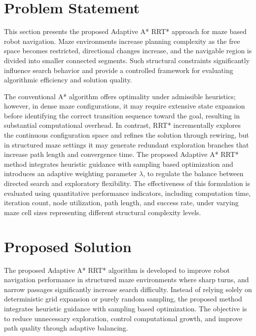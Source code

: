 \documentclass[a4paper,12pt,one side]{report}
\theoremstyle{definition}
\begin{document}
\begin{itemize}
\section{Problem Statement}

This section presents the proposed Adaptive A* RRT* approach for maze based robot navigation.\cite{ju2020path} Maze environments increase planning complexity as the free space becomes restricted, directional changes increase, and the navigable region is divided into smaller connected segments. Such structural constraints significantly influence search behavior and provide a controlled framework for evaluating algorithmic efficiency and solution quality.\cite{karur2021survey}

The conventional A* algorithm offers optimality under admissible heuristics; however, in dense maze configurations, \cite{souissi2013path} it may require extensive state expansion before identifying the correct transition sequence toward the goal, resulting in substantial computational overhead. In contrast, RRT* incrementally explores the continuous configuration space and refines the solution through rewiring, but in structured maze settings it may generate redundant exploration branches that increase path length and convergence time. The proposed Adaptive A* RRT* method integrates heuristic guidance with sampling based optimization and introduces an adaptive weighting parameter $\lambda$, to regulate the balance between directed search and exploratory flexibility. The effectiveness of this formulation is evaluated using quantitative performance indicators, including computation time, iteration count, node utilization, path length, and success rate, under varying maze cell sizes representing different structural complexity levels.

\section{Proposed Solution}

The proposed Adaptive A* RRT* algorithm is developed to improve robot navigation performance in structured maze environments where sharp turns, and narrow passages significantly increase search difficulty. Instead of relying solely on deterministic grid expansion or purely random sampling, the proposed method integrates heuristic guidance with sampling based optimization. The objective is to reduce unnecessary exploration, control computational growth, and improve path quality through adaptive balancing.


\end{itemize}
\end{document}

